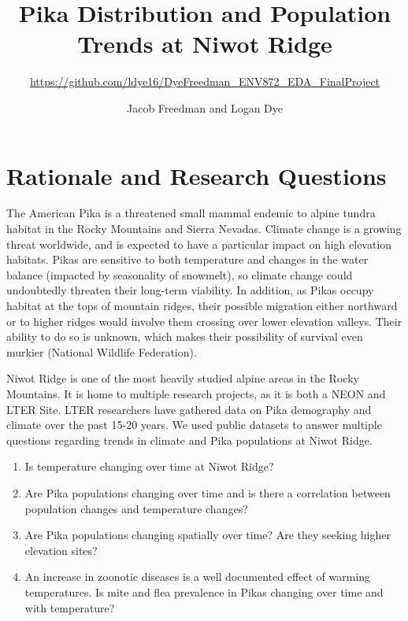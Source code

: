 \documentclass[
  12pt,
]{article}
\title{Pika Distribution and Population Trends at Niwot Ridge}
\subtitle{\url{https://github.com/ldye16/DyeFreedman_ENV872_EDA_FinalProject}}
\author{Jacob Freedman and Logan Dye}
\date{}
\providecommand{\tightlist}{%
  \setlength{\itemsep}{0pt}\setlength{\parskip}{0pt}}
\begin{document}
\maketitle

\newpage
\tableofcontents 
\newpage
\listoffigures 
\newpage

\hypertarget{rationale-and-research-questions}{%
\section{Rationale and Research
Questions}\label{rationale-and-research-questions}}

The American Pika is a threatened small mammal endemic to alpine tundra
habitat in the Rocky Mountains and Sierra Nevadas. Climate change is a
growing threat worldwide, and is expected to have a particular impact on
high elevation habitats. Pikas are sensitive to both temperature and
changes in the water balance (impacted by seasonality of snowmelt), so
climate change could undoubtedly threaten their long-term viability. In
addition, as Pikas occupy habitat at the tops of mountain ridges, their
possible migration either northward or to higher ridges would involve
them crossing over lower elevation valleys. Their ability to do so is
unknown, which makes their possibility of survival even murkier
(National Wildlife Federation).

Niwot Ridge is one of the most heavily studied alpine areas in the Rocky
Mountains. It is home to multiple research projects, as it is both a
NEON and LTER Site. LTER researchers have gathered data on Pika
demography and climate over the past 15-20 years. We used public
datasets to answer multiple questions regarding trends in climate and
Pika populations at Niwot Ridge.

\begin{enumerate}
\def\labelenumi{\arabic{enumi}.}
\tightlist
\item
  Is temperature changing over time at Niwot Ridge?
\item
  Are Pika populations changing over time and is there a correlation
  between population changes and temperature changes?
\item
  Are Pika populations changing spatially over time? Are they seeking
  higher elevation sites?
\item
  An increase in zoonotic diseases is a well documented effect of
  warming temperatures. Is mite and flea prevalence in Pikas changing
  over time and with temperature?
\end{enumerate}
\end{document}

